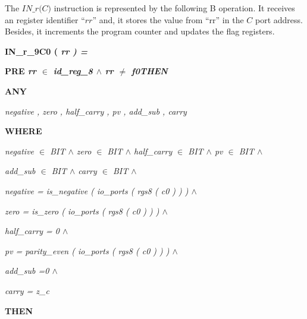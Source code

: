 \documentclass[a4paper]{llncs}
\newcommand{\footnoterecall}[1]{
  \footnotemark[\value{#1}]
}
\begin{document}
The $\textit{IN\_r(C)}$\footnoterecall{myfootnote} instruction is represented
by the following B operation. It receives an register identifier ``$\textit{rr}$'' and, it stores the value from ``rr'' in the $\textit{C}$ port address. Besides, it increments the program counter and updates the flag registers.

\hspace*{0.0in}\bf IN\_r\_9C0 \rm ( \it rr \rm ) \rm =

\hspace*{0.0in}\bf PRE \it rr  $\in$  \it id\_reg\_8  $\land$  \it rr  $\not =$  \it f0\hspace*{0.15in}\bf THEN

\hspace*{0.20in}\bf ANY

\hspace*{0.40in}\it negative \rm , \it zero \rm , \it half\_carry \rm , \it pv \rm , \it add\_sub \rm , \it carry

\hspace*{0.20in}\bf WHERE 

\hspace*{0.40in}\it negative $\in$ \it BIT $\land$ \it zero $\in$ \it BIT $\land$ \it half\_carry $\in$ \it BIT 
$\land$ \it pv $\in$ \it BIT $\land$

 \hspace*{0.40in}\it add\_sub $\in$ \it BIT $\land$ \it carry $\in$ \it BIT  $\land$

\hspace*{0.40in}\it negative \rm = \it is\_negative \rm ( \it io\_ports \rm ( \it rgs8 \rm ( \it c0 \rm ) \rm ) \rm )  $\land$ 

\hspace*{0.40in}\it zero \rm = \it is\_zero \rm ( \it io\_ports \rm ( \it rgs8 \rm ( \it c0 \rm ) \rm ) \rm )  $\land$ 

\hspace*{0.40in}\it half\_carry \rm = \rm 0  $\land$ 

\hspace*{0.40in}\it pv \rm = \it parity\_even \rm ( \it io\_ports \rm ( \it rgs8 \rm ( \it c0 \rm ) \rm ) \rm ) $\land$

\hspace*{0.40in}\it add\_sub \rm =\hspace*{0.10in}\rm 0  $\land$ 

\hspace*{0.40in}\it carry \rm = \it z\_c

\hspace*{0.20in}\bf THEN
\end{document}
